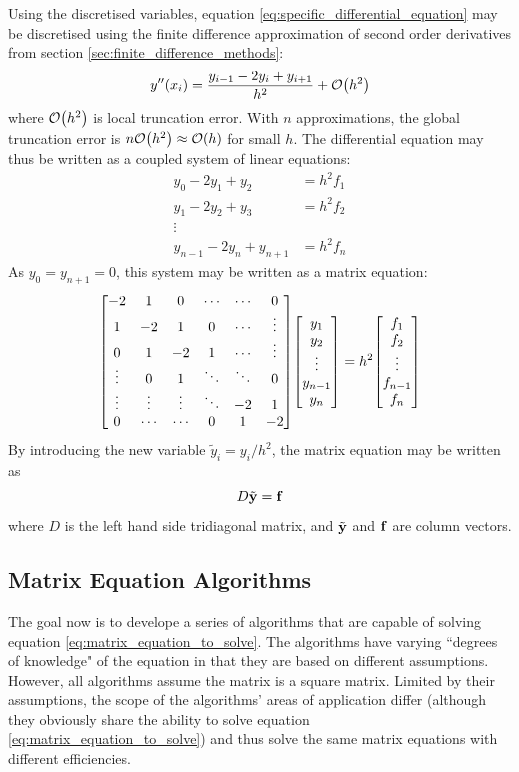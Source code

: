 \documentclass[reprint,english]{revtex4-1}
\begin{document}
Using the discretised variables, equation \eqref{eq:specific_differential_equation} may be discretised using the finite difference approximation of second order derivatives from section \ref{sec:finite_difference_methods}:
\begin{equation}
y''(x_i)=\frac{y_{i-1}-2y_i+y_{i+1}}{h^2}+\order{h^2}
\end{equation}
where \(\order{h^2}\) is local truncation error. With \(n\) approximations, the global truncation error is \(n\order{h^2}\approx\order{h}\) for small \(h\).
\newpage
The differential equation may thus be written as a coupled system of linear equations:
\begin{align*}
y_0-2y_1+y_2&=h^2f_1\\
y_1-2y_2+y_3&=h^2f_2\\
\vdots&\\
y_{n-1}-2y_n+y_{n+1}&=h^2f_n
\end{align*}
As \(y_0=y_{n+1}=0\), this system may be written as a matrix equation:
\[\mqty[-2 & 1 & 0 & \cdots & \cdots & 0 \\
1 & -2 & 1 & 0 & \cdots & \vdots \\
0 & 1 & -2 & 1 & \cdots & \vdots \\
\vdots & 0 & 1 & \ddots & \ddots & 0 \\
\vdots & \vdots & \vdots & \ddots & -2 & 1 \\
0 & \cdots & \cdots & 0 & 1 & -2]\mqty[y_1\\y_2\\\vdots\\y_{n-1}\\y_n]
=h^2\mqty[f_1\\f_2\\\vdots\\f_{n-1}\\f_n]\]
By introducing the new variable \(\tilde{y}_i=y_i/h^2\), the matrix equation may be written as
\begin{equation}\label{eq:matrix_equation_to_solve}
D\tilde{\vb{y}}=\vb{f}
\end{equation}
where \(D\) is the left hand side tridiagonal matrix, and \(\tilde{\vb{y}}\) and \(\vb{f}\) are column vectors.
\subsection{Matrix Equation Algorithms}
The goal now is to develope a series of algorithms that are capable of solving equation \eqref{eq:matrix_equation_to_solve}. The algorithms have varying ``degrees of knowledge" of the equation in that they are based on different assumptions. However, all algorithms assume the matrix is a square matrix. Limited by their assumptions, the scope of the algorithms' areas of application differ (although they obviously share the ability to solve equation \eqref{eq:matrix_equation_to_solve}) and thus solve the same matrix equations with different efficiencies.
\end{document}
